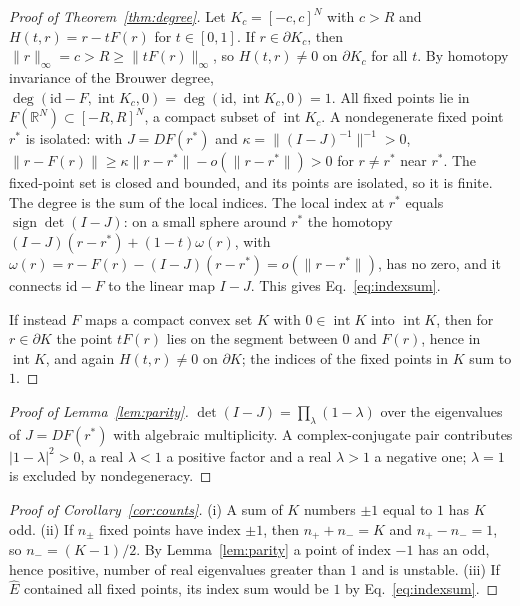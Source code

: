 \documentclass[aip,cha,reprint,amsmath,amssymb,longbibliography]{revtex4-2}
\theoremstyle{definition}
\begin{document}
\begin{proof}[Proof of Theorem~\ref{thm:degree}]
Let $K_c=[-c,c]^N$ with $c>R$ and $H(t,r)=r-tF(r)$ for $t\in[0,1]$. If $r\in\partial K_c$, then
$\|r\|_\infty=c>R\ge\|tF(r)\|_\infty$, so $H(t,r)\neq0$ on $\partial K_c$ for all $t$. By homotopy invariance of the
Brouwer degree,\cite{Deimling1985NFA} $\deg(\mathrm{id}-F,\operatorname{int}K_c,0)=\deg(\mathrm{id},\operatorname{int}K_c,0)=1$.
All fixed points lie in $F(\mathbb{R}^N)\subset[-R,R]^N$, a compact subset of $\operatorname{int}K_c$. A nondegenerate fixed
point $r^*$ is isolated: with $J=DF(r^*)$ and $\kappa=\|(I-J)^{-1}\|^{-1}>0$,
$\|r-F(r)\|\ge\kappa\|r-r^*\|-o(\|r-r^*\|)>0$ for $r\neq r^*$ near $r^*$. The fixed-point set is closed and bounded, and its
points are isolated, so it is finite. The degree is the sum of the local indices. The local index at $r^*$ equals
$\operatorname{sign}\det(I-J)$: on a small sphere around $r^*$ the homotopy $(I-J)(r-r^*)+(1-t)\omega(r)$, with
$\omega(r)=r-F(r)-(I-J)(r-r^*)=o(\|r-r^*\|)$, has no zero, and it connects $\mathrm{id}-F$ to the linear map
$I-J$.\cite{Deimling1985NFA,GranasDugundji2003Fixed} This gives Eq.~\eqref{eq:indexsum}.

If instead $F$ maps a compact convex set $K$ with $0\in\operatorname{int}K$ into $\operatorname{int}K$, then for
$r\in\partial K$ the point $tF(r)$ lies on the segment between $0$ and $F(r)$, hence in $\operatorname{int}K$, and again
$H(t,r)\neq0$ on $\partial K$; the indices of the fixed points in $K$ sum to $1$.
\end{proof}

\begin{proof}[Proof of Lemma~\ref{lem:parity}]
$\det(I-J)=\prod_\lambda(1-\lambda)$ over the eigenvalues of $J=DF(r^*)$ with algebraic multiplicity. A complex-conjugate pair
contributes $|1-\lambda|^2>0$, a real $\lambda<1$ a positive factor and a real $\lambda>1$ a negative one; $\lambda=1$ is
excluded by nondegeneracy.
\end{proof}

\begin{proof}[Proof of Corollary~\ref{cor:counts}]
(i) A sum of $K$ numbers $\pm1$ equal to $1$ has $K$ odd. (ii) If $n_\pm$ fixed points have index $\pm1$, then
$n_++n_-=K$ and $n_+-n_-=1$, so $n_-=(K-1)/2$. By Lemma~\ref{lem:parity} a point of index $-1$ has an odd, hence positive,
number of real eigenvalues greater than $1$ and is unstable. (iii) If $\hat E$ contained all fixed points, its index sum
would be $1$ by Eq.~\eqref{eq:indexsum}.
\end{proof}
\end{document}
